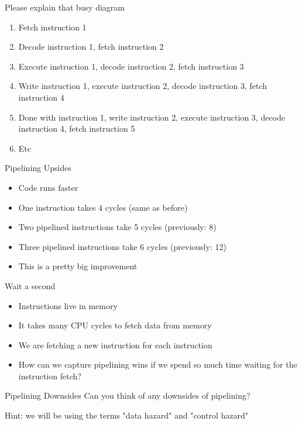 \begin{frame}{Please explain that busy diagram}
	\begin{enumerate}
		\item Fetch instruction 1
		\item Decode instruction 1, fetch instruction 2
		\item Execute instruction 1, decode instruction 2, fetch instruction 3
		\item Write instruction 1, execute instruction 2, decode instruction 3, fetch instruction 4
		\item Done with instruction 1, write instruction 2, execute instruction 3, decode instruction 4, fetch instruction 5
		\item Etc
	\end{enumerate}
\end{frame}


\begin{frame}{Pipelining Upsides}
	\begin{itemize}
		\item Code runs faster
		\item One instruction takes 4 cycles (same as before)
		\item Two pipelined instructions take 5 cycles (previously: 8)
		\item Three pipelined instructions take 6 cycles (previously: 12)
		\item This is a pretty big improvement
	\end{itemize}
\end{frame}


\begin{frame}{Wait a second}
	\begin{itemize}
		\item Instructions live in memory
		\item It takes many CPU cycles to fetch data from memory
		\item We are fetching a new instruction for each instruction
		\item How can we capture pipelining wins if we spend so much time waiting for the instruction fetch?
	\end{itemize}
\end{frame}




\begin{frame}{Pipelining Downsides}
	Can you think of any downsides of pipelining?


	Hint: we will be using the terms "data hazard" and "control hazard"
\end{frame}



